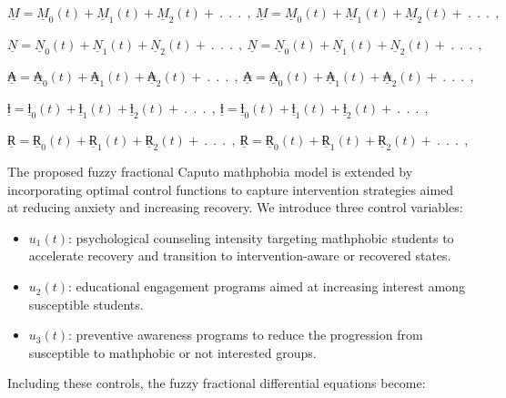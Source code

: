 \documentclass[10pt]{NSP1}
\begin{document}
\(\underline{M} = {\underline{M}}_{0}(t) + {\underline{M}}_{1}(t) + {\underline{M}}_{2}(t) + \ .\ \ .\ \ .\ \ ,\ \underline{M} = {\underline{M}}_{0}(t) + {\underline{M}}_{1}(t) + {\underline{M}}_{2}(t) + \ .\ \ .\ \ .\ \ ,\)

\(\underline{N} = {\underline{N}}_{0}(t) + {\underline{N}}_{1}(t) + {\underline{N}}_{2}(t) + \ .\ \ .\ \ .\ \ ,\ \underline{N} = {\underline{N}}_{0}(t) + {\underline{N}}_{1}(t) + {\underline{N}}_{2}(t) + \ .\ \ .\ \ .\ \ ,\)

\(\underline{₳} = {\underline{₳}}_{0}(t) + {\underline{₳}}_{1}(t) + {\underline{₳}}_{2}(t) + \ .\ \ .\ \ .\ \ ,\ \underline{₳} = {\underline{₳}}_{0}(t) + {\underline{₳}}_{1}(t) + {\underline{₳}}_{2}(t) + \ .\ \ .\ \ .\ \ ,\)

\(\underline{ƚ} = {\underline{ƚ}}_{0}(t) + {\underline{ƚ}}_{1}(t) + {\underline{ƚ}}_{2}(t) + \ .\ \ .\ \ .\ \ ,\ \underline{ƚ} = {\underline{ƚ}}_{0}(t) + {\underline{ƚ}}_{1}(t) + {\underline{ƚ}}_{2}(t) + \ .\ \ .\ \ .\ \ ,\)

\(\underline{Ɍ} = {\underline{Ɍ}}_{0}(t) + {\underline{Ɍ}}_{1}(t) + {\underline{Ɍ}}_{2}(t) + \ .\ \ .\ \ .\ \ ,\ \underline{Ɍ} = {\underline{Ɍ}}_{0}(t) + {\underline{Ɍ}}_{1}(t) + {\underline{Ɍ}}_{2}(t) + \ .\ \ .\ \ .\ \ ,\)

\par\medskip{}\smallskip

The proposed fuzzy fractional Caputo mathphobia model is extended by incorporating optimal control functions to capture intervention strategies aimed at reducing anxiety and increasing recovery. We introduce three control variables:

\begin{itemize}
  \item \(u_{1}(t)\): psychological counseling intensity targeting mathphobic students to accelerate recovery and transition to intervention-aware or recovered states.
  \item \(u_{2}(t)\): educational engagement programs aimed at increasing interest among susceptible students.
  \item \(u_{3}(t)\): preventive awareness programs to reduce the progression from susceptible to mathphobic or not interested groups.
\end{itemize}

Including these controls, the fuzzy fractional differential equations become:
\end{document}
